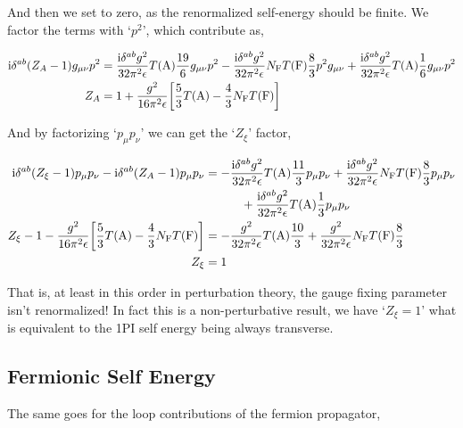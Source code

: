 And then we set to zero, as the renormalized self-energy should be finite. We factor the terms with `$p^2$', which contribute as,

\begin{align}
    \textnormal{i}\delta^{ab}\qty(Z_A-1)g_{\mu\nu}p^2&=\frac{\textnormal{i}\delta^{ab}g^2}{32\pi^2\epsilon}T\qty(\textnormal{A})\frac{19}{6}g_{\mu\nu}p^2-\frac{\textnormal{i}\delta^{ab}g^2}{32\pi^2\epsilon}N_{\textnormal{F}}T\qty(\textnormal{F})\frac83p^2g_{\mu\nu}+\frac{\textnormal{i}\delta^{ab}g^2}{32\pi^2\epsilon}T\qty(\textnormal{A})\frac{1}{6}g_{\mu\nu}p^2\nonumber\\
    Z_A&=1+\frac{g^2}{16\pi^2\epsilon}\qty[\frac{5}{3}T\qty(\textnormal{A})-\frac43N_{\textnormal{F}}T\qty(\textnormal{F})]\nonumber
\end{align}

And by factorizing `$p_\mu p_\nu$' we can get the `$Z_\xi$' factor,

\begin{align}
    \textnormal{i}\delta^{ab}\qty(Z_\xi-1)p_\mu p_\nu-\textnormal{i}\delta^{ab}\qty(Z_A-1)p_\mu p_\nu&=-\frac{\textnormal{i}\delta^{ab}g^2}{32\pi^2\epsilon}T\qty(\textnormal{A})\frac{11}{3}p_\mu p_\nu
    +\frac{\textnormal{i}\delta^{ab}g^2}{32\pi^2\epsilon}N_{\textnormal{F}}T\qty(\textnormal{F})\frac83p_\mu p_\nu\nonumber\\
    &\quad\quad\quad+\frac{\textnormal{i}\delta^{ab}g^2}{32\pi^2\epsilon}T\qty(\textnormal{A})\frac13p_\mu p_\nu\nonumber\\
    Z_\xi-1-\frac{g^2}{16\pi^2\epsilon}\qty[\frac{5}{3}T\qty(\textnormal{A})-\frac43N_{\textnormal{F}}T\qty(\textnormal{F})]&=-\frac{g^2}{32\pi^2\epsilon}T\qty(\textnormal{A})\frac{10}{3}
    +\frac{g^2}{32\pi^2\epsilon}N_{\textnormal{F}}T\qty(\textnormal{F})\frac83\nonumber\\
    Z_\xi&=1\nonumber
\end{align}

That is, at least in this order in perturbation theory, the gauge fixing parameter isn't renormalized! In fact 
this is a non-perturbative result, we have `$Z_\xi=1$' what is equivalent to the 1PI self energy being always 
transverse.

\subsection{Fermionic Self Energy}

The same goes for the loop contributions of the fermion propagator,

